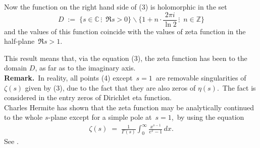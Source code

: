 \documentclass[12pt]{article}
\theoremstyle{definition}
\begin{document}
Now the function on the right hand side of (3) is holomorphic in the set
$$D \;:=\; \{s\in\mathbb{C}\,\vdots\,\,\, \Re{s} > 0\}\smallsetminus 
      \{1\!+\!n\!\cdot\!\frac{2\pi i}{\ln{2}}\,\vdots\,\,\, n\in\mathbb{Z}\}$$
and the values of this function coincide with the values of zeta function in the half-plane\, $\Re{s} > 1$.

This result means that, via the equation (3), the zeta function has been  to the domain $D$, as far as to the imaginary axis.\\

\textbf{Remark.}\, In reality, all points (4) except\, $s = 1$\, are removable singularities of $\zeta(s)$ given by (3), due to the fact that they are also zeros of $\eta(s)$.\, The fact is considered in the entry zeros of Dirichlet eta function.\\

Charles Hermite has shown that the zeta function may be analytically continued to the whole $s$-plane except for a simple pole at\, $s = 1$,\, by using the equation
\begin{align}
\zeta(s) \;=\; \frac{1}{\Gamma(s)}\int_0^\infty\!\frac{x^{s-1}}{e^x-1}\,dx.
\end{align}
See .
\end{document}
